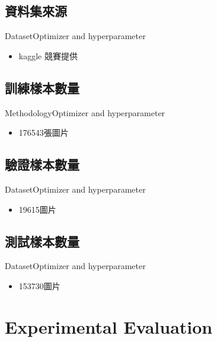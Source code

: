 \documentclass{beamer}
\begin{document}
\begin{CJK}{UTF8}{}
\subsection{資料集來源}

\begin{frame}{Dataset}{Optimizer and hyperparameter}
	\begin{itemize}
	\item{
		kaggle 競賽提供
	}
	\end{itemize}
\end{frame}

\subsection{訓練樣本數量}

\begin{frame}{Methodology}{Optimizer and hyperparameter}
	\begin{itemize}
	\item{
		176543張圖片
	}
	\end{itemize}
\end{frame}

\subsection{驗證樣本數量}

\begin{frame}{Dataset}{Optimizer and hyperparameter}
	\begin{itemize}
	\item{
		19615圖片
	}
	\end{itemize}
\end{frame}

\subsection{測試樣本數量}

\begin{frame}{Dataset}{Optimizer and hyperparameter}
	\begin{itemize}
	\item{
		153730圖片
	}
	\end{itemize}
\end{frame}

\section{Experimental Evaluation}


\end{CJK}
\end{document}
